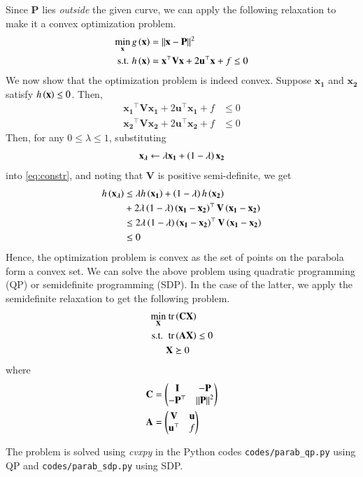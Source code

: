 \documentclass[journal,12pt,twocolumn]{IEEEtran}
\renewcommand{\vec}[1]{\boldsymbol{\mathbf{#1}}}
\begin{document}
\begin{enumerate}
    Since $\vec{P}$ lies \textit{outside} the given curve, we can apply the following
    relaxation to make it a convex optimization problem.
    \begin{align}
        \min_{\vec{x}} g\brak{\vec{x}} &= \norm{\vec{x}-\vec{P}}^2 \label{eq:cost} \\
        \textrm{s.t. } h\brak{\vec{x}} &= \vec{x}^\top\vec{Vx} + 2\vec{u}^\top\vec{x} + f \le 0 \label{eq:constr}
    \end{align}
    We now show that the optimization problem is indeed convex. Suppose 
    $\vec{x_1}$ and $\vec{x_2}$ satisfy $h\brak{\vec{x}} \le 0$. Then, 
    \begin{align}
        \vec{x_1}^\top\vec{Vx_1} + 2\vec{u}^\top\vec{x_1} + f &\le 0 \\
        \vec{x_2}^\top\vec{Vx_2} + 2\vec{u}^\top\vec{x_2} + f &\le 0 
    \end{align}
    Then, for any $0 \le \lambda \le 1$, substituting
    \begin{align}
        \vec{x_\lambda} \leftarrow \lambda\vec{x_1} + \brak{1-\lambda}\vec{x_2}
    \end{align}
    into \eqref{eq:constr}, and noting that $\vec{V}$ is positive semi-definite, 
    we get
    \begin{align}
        h\brak{\vec{x_\lambda}} &\le \lambda h\brak{\vec{x_1}} + \brak{1-\lambda}h\brak{\vec{x_2}} \nonumber \\
                                &+ 2\lambda\brak{1-\lambda}\brak{\vec{x_1}-\vec{x_2}}^\top\vec{V}\brak{\vec{x_1}-\vec{x_2}} \\
                                &\le 2\lambda\brak{1-\lambda}\brak{\vec{x_1}-\vec{x_2}}^\top\vec{V}\brak{\vec{x_1}-\vec{x_2}} \\
                                &\le 0
        \label{eq:convex}
    \end{align}
    Hence, the optimization problem is convex as the set of points on the 
    parabola form a convex set. We can solve the above problem using quadratic
    programming (QP) or semidefinite programming (SDP). In the case of the latter, we
    apply the semidefinite relaxation to get the following problem.
    \begin{align}
        \min_{\vec{X}}&\textrm{ tr}\brak{\vec{CX}} \label{eq:sdp-cost} \\
        \textrm{s.t. }&\textrm{ tr}\brak{\vec{AX}} \le 0 \label{eq:sdp-constr} \\
                      &\vec{X} \succeq 0
    \end{align}
    where
    \begin{align}
        \vec{C} &= \myvec{\vec{I}&-\vec{P}\\-\vec{P}^\top&\norm{\vec{P}}^2} \label{eq:C-def} \\
        \vec{A} &= \myvec{\vec{V}&\vec{u}\\\vec{u}^\top&f} \label{eq:A-def}
    \end{align}

    The problem is solved using \textit{cvxpy} in the Python codes 
    \texttt{codes/parab\_qp.py} using QP and \texttt{codes/parab\_sdp.py}
    using SDP.
\end{enumerate}
\end{document}
